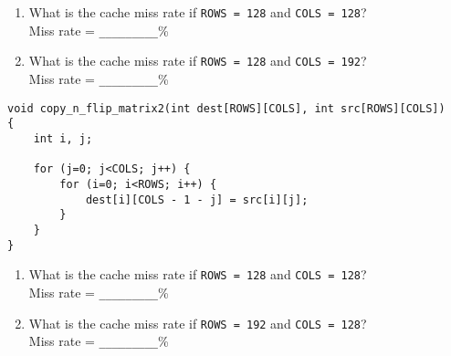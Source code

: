 \begin{enumerate}

\item What is the cache miss rate if {\tt ROWS = 128} and {\tt COLS = 128}?\\
Miss rate = \verb|_________|\% 
\item What is the cache miss rate if {\tt ROWS = 128} and {\tt COLS = 192}?\\
Miss rate = \verb|_________|\% 

\end{enumerate}

{\small\begin{verbatim}
void copy_n_flip_matrix2(int dest[ROWS][COLS], int src[ROWS][COLS])
{
    int i, j;

    for (j=0; j<COLS; j++) {
        for (i=0; i<ROWS; i++) {
            dest[i][COLS - 1 - j] = src[i][j];
        }
    }
}
\end{verbatim}}

\begin{enumerate}

\item What is the cache miss rate if {\tt ROWS = 128} and {\tt COLS = 128}?\\
Miss rate = \verb|_________|\% 
\item What is the cache miss rate if {\tt ROWS = 192} and {\tt COLS = 128}?\\
Miss rate = \verb|_________|\% 

\end{enumerate}
